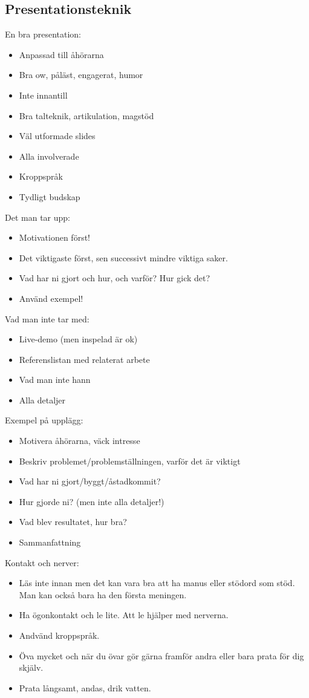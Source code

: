 \begin{multicols}{2}
\section{Presentationsteknik}
En bra presentation:
\begin{itemize}
\item Anpassad till åhörarna
\item Bra ow, påläst, engagerat, humor
\item Inte innantill
\item Bra talteknik, artikulation, magstöd
\item Väl utformade slides
\item Alla involverade
\item Kroppspråk
\item Tydligt budskap
\end{itemize}

Det man tar upp:
\begin{itemize}
\item Motivationen först!
\item Det viktigaste först, sen successivt mindre viktiga saker.
\item Vad har ni gjort och hur, och varför? Hur gick det?
\item Använd exempel!
\end{itemize}

Vad man inte tar med:
\begin{itemize}
\item Live-demo (men inspelad är ok)
\item Referenslistan med relaterat arbete
\item Vad man inte hann
\item Alla detaljer
\end{itemize}

Exempel på upplägg:
\begin{itemize}
\item Motivera åhörarna, väck intresse
\item Beskriv problemet/problemställningen, varför det är viktigt
\item Vad har ni gjort/byggt/åstadkommit?
\item Hur gjorde ni? (men inte alla detaljer!)
\item Vad blev resultatet, hur bra?
\item Sammanfattning
\end{itemize}

Kontakt och nerver:
\begin{itemize}
\item Läs inte innan men det kan vara bra att ha manus eller stödord som stöd. Man kan också bara ha den första meningen.
\item Ha ögonkontakt och le lite. Att le hjälper med nerverna.
\item Andvänd kroppspråk. 
\item Öva mycket och när du övar gör gärna framför andra eller bara prata för dig skjälv.
\item Prata långsamt, andas, drik vatten.
\end{itemize}


\end{multicols}
